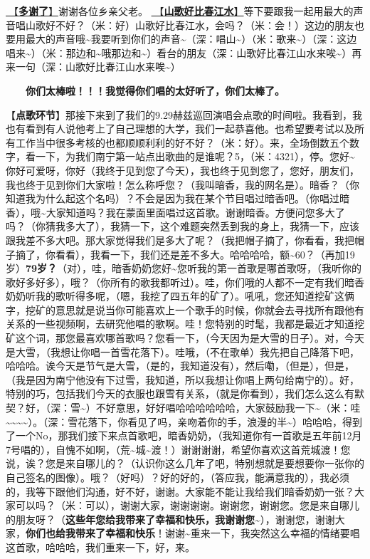 \documentclass[]{ctexbook}
\begin{document}
\hyperref[folk-songs-like-spring-river]{🎵【\textbf{多谢了}】}谢谢各位乡亲父老。
\hyperref[folk-songs-like-spring-river]{🎵【\textbf{山歌好比春江水}】}等下要跟我一起用最大的声音唱山歌好不好？（米：好）山歌好比春江水，会吗？（米：会！）这边的朋友也要用最大的声音哦\textasciitilde 我要听到你们的声音\textasciitilde（深：唱山\textasciitilde）（米：歌来\textasciitilde）（深：这边唱来\textasciitilde）（米：那边和\textasciitilde 哦那边和\textasciitilde）看台的朋友（深：山歌好比春江山水来唉\textasciitilde）再来一句（深：山歌好比春江山水来唉\textasciitilde）

  \textbf{你们太棒啦！！！我觉得你们唱的太好听了，你们太棒了。}

【\textbf{点歌环节}】那接下来到了我们的9.29赫兹巡回演唱会点歌的时间啦。我看到，我也有看到有人说他考上了自己理想的大学，我们一起恭喜他。也希望要考试以及所有工作当中很多考核的也都顺顺利利的好不好？（米：好）。来，全场倒数五个数字，看一下，为我们南宁第一站点出歌曲的是谁呢？5，（米：4321），停。您好\textasciitilde 你好可爱呀，你好（我终于见到您了今天），我也终于见到您了，您好，朋友们，我也终于见到你们大家啦！怎么称呼您？（我叫暗香，我的网名是）。暗香？（你知道我为什么起这个名吗）？不会是因为我在某个节目唱过暗香吧。（你唱过暗香），哦\textasciitilde 大家知道吗？我在蒙面里面唱过这首歌。谢谢暗香。方便问您多大了吗？（你猜我多大了），我猜一下，这个难题突然丢到我的身上，我猜一下，应该跟我差不多大吧。那大家觉得我们是多大了呢？（我把帽子摘了，你看看，我把帽子摘了，你看看），我看一下，我们还是差不多大。哈哈哈哈，额\textasciitilde60？（再加19岁）\textbf{79岁？}（对），哇，暗香奶奶您好\textasciitilde 您听我的第一首歌是哪首歌呀，（我听你的歌好多好多），哦？（你所有的歌我都听过）。哇，你们哦的人都不一定有我们暗香奶奶听我的歌听得多呢，（嗯，我挖了四五年的矿了）。吼吼，您还知道挖矿这俩字，挖矿的意思就是说当你可能喜欢上一个歌手的时候，你就会去寻找所有跟他有关系的一些视频啊，去研究他唱的歌啊。哇！您特别的时髦，我都是最近才知道挖矿这个词，那您最喜欢哪首歌吗？您看一下，（今天因为是大雪的日子）。对，今天是大雪，（我想让你唱一首雪花落下）。哇哦，（不在歌单）我先把自己降落下吧，哈哈哈。诶今天是节气是大雪，（是的，我知道没有），然后嘞，（但是），但是，（我是因为南宁他没有下过雪，我知道，所以我想让你唱上两句给南宁的）。好，特别的巧，包括我们今天的衣服也跟雪有关系，（就是你看到），我们怎么这么有默契？好，（深：雪\textasciitilde）不好意思，好好唱哈哈哈哈哈哈，大家鼓励我一下\textasciitilde（米：哇\textasciitilde\textasciitilde\textasciitilde\textasciitilde）。（深：雪花落下，你看见了吗，亲吻着你的手，浪漫的半\textasciitilde）哈哈哈，得到了一个No，那我们接下来点首歌吧，暗香奶奶，（我知道你有一首歌是五年前12月7号唱的），自愧不如啊，（荒\textasciitilde 城\textasciitilde 渡！）谢谢谢谢，希望你喜欢这首荒城渡！您说，诶？您是来自哪儿的？（认识你这么几年了吧，特别想就是要想要你一张你的自己签名的图像）。哦？（好吗）？好的好的，（答应我，能满意我的），我必须的，我等下跟他们沟通，好不好，谢谢。大家能不能让我给我们暗香奶奶一张？大家可以吗？（米：可以），谢谢大家，谢谢谢谢。谢谢您，谢谢您。您是来自哪儿的朋友呀？（\textbf{这些年您给我带来了幸福和快乐，我谢谢您\textasciitilde{}}），谢谢您，谢谢大家，\textbf{你们也给我带来了幸福和快乐}！谢谢\textasciitilde 重来一下，我突然这么幸福的情绪要唱这首歌，哈哈哈，我们重来一下，好，来。
\end{document}
